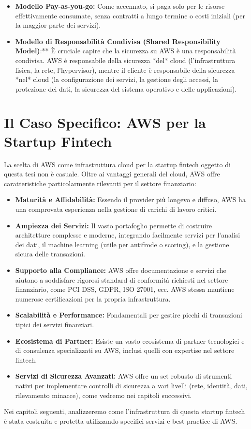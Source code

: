 \begin{itemize}
\begin{itemize}
        \end{itemize}
    \item \textbf{Modello Pay-as-you-go:} Come accennato, si paga solo per le risorse effettivamente consumate, senza contratti a lungo termine o costi iniziali (per la maggior parte dei servizi).
    \item \textbf{Modello di Responsabilità Condivisa (Shared Responsibility Model)}:** È cruciale capire che la sicurezza su AWS è una responsabilità condivisa. AWS è responsabile della sicurezza *del* cloud (l'infrastruttura fisica, la rete, l'hypervisor), mentre il cliente è responsabile della sicurezza *nel* cloud (la configurazione dei servizi, la gestione degli accessi, la protezione dei dati, la sicurezza del sistema operativo e delle applicazioni).
\end{itemize}

\section{Il Caso Specifico: AWS per la Startup Fintech}
\label{sec:aws-for-fintech}

La scelta di AWS come infrastruttura cloud per la startup fintech oggetto di questa tesi non è casuale. Oltre ai vantaggi generali del cloud, AWS offre caratteristiche particolarmente rilevanti per il settore finanziario:
\begin{itemize}
    \item \textbf{Maturità e Affidabilità:} Essendo il provider più longevo e diffuso, AWS ha una comprovata esperienza nella gestione di carichi di lavoro critici.
    \item \textbf{Ampiezza dei Servizi:} Il vasto portafoglio permette di costruire architetture complesse e moderne, integrando facilmente servizi per l'analisi dei dati, il machine learning (utile per antifrode o scoring), e la gestione sicura delle transazioni.
    \item \textbf{Supporto alla Compliance:} AWS offre documentazione e servizi che aiutano a soddisfare rigorosi standard di conformità richiesti nel settore finanziario, come PCI DSS, GDPR, ISO 27001, ecc. AWS stessa mantiene numerose certificazioni per la propria infrastruttura.
    \item \textbf{Scalabilità e Performance:} Fondamentali per gestire picchi di transazioni tipici dei servizi finanziari.
    \item \textbf{Ecosistema di Partner:} Esiste un vasto ecosistema di partner tecnologici e di consulenza specializzati su AWS, inclusi quelli con expertise nel settore fintech.
    \item \textbf{Servizi di Sicurezza Avanzati:} AWS offre un set robusto di strumenti nativi per implementare controlli di sicurezza a vari livelli (rete, identità, dati, rilevamento minacce), come vedremo nei capitoli successivi.
\end{itemize}
Nei capitoli seguenti, analizzeremo come l'infrastruttura di questa startup fintech è stata costruita e protetta utilizzando specifici servizi e best practice di AWS.
